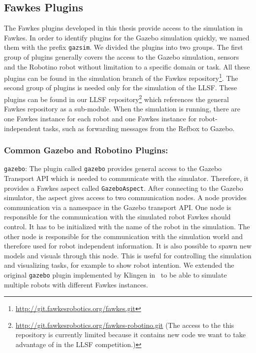 \subsection{Fawkes Plugins}
The Fawkes plugins developed in this thesis provide access to the simulation in Fawkes. In order to identify plugins for the Gazebo simulation quickly, we named them with the prefix \texttt{gazsim}. We divided the plugins into two groups. The first group of plugins generally covers the access to the Gazebo simulation, sensors and the Robotino robot without limitation to a specific domain or task. All these plugins can be found in the simulation branch of the Fawkes repository\footnote{\url{http://git.fawkesrobotics.org/fawkes.git}}. The second group of plugins is needed only for the simulation of the LLSF. These plugins can be found in our LLSF repository\footnote{\url{http://git.fawkesrobotics.org/fawkes-robotino.git} (The access to the this repository is currently limited because it contains new code we want to take advantage of in the LLSF competition.)} which references the general Fawkes repository as a sub-module. When the simulation is running, there are one Fawkes instance for each robot and one Fawkes instance for robot-independent tasks, such as forwarding messages from the Refbox to Gazebo. 

\subsubsection{Common Gazebo and Robotino Plugins:}

\texttt{gazebo}: The plugin called \texttt{gazebo} provides general access to the Gazebo Transport API which is needed to communicate with the simulator. Therefore, it provides a Fawkes aspect called \texttt{GazeboAspect}. After connecting to the Gazebo simulator, the aspect gives access to two communication nodes. A node provides communication via a namespace in the Gazebo transport API. One node is responsible for the communication with the simulated robot Fawkes should control. It has to be initialized with the name of the robot in the simulation. The other node is responsible for the communication with the simulation world and therefore used for robot independent information. It is also possible to spawn new models and visuals through this node. This is useful for controlling the simulation and visualizing tasks, for example to show robot intention. We extended the original \texttt{gazebo} plugin implemented by Klingen in~\cite{KlingenDA} to be able to simulate multiple robots with different Fawkes instances.\\

